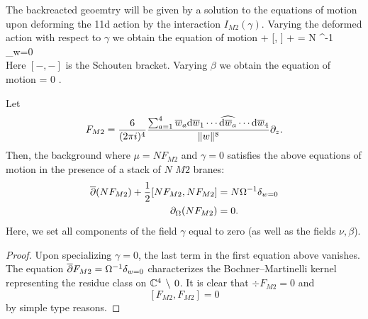 


The backreacted geoemtry will be given by a solution to the equations of motion upon deforming the 11d action by the interaction $I_{M2}(\gamma)$. 
Varying the deformed action with respect to $\gamma$ 
we obtain the equation of motion
\beqn\label{eqn:ads4eom1}
\dbar \mu +  [\mu, \mu] + \partial\gamma\partial\gamma = N \Omega^{-1} \delta_{w=0} \\
\eeqn
Here $[-,-]$ is the Schouten bracket. 
Varying $\beta$ we obtain the equation of motion
\beqn\label{eqn:adseom2}
\div \mu = 0 .
\eeqn

\begin{lem}
Let
\[
 F_{M2} = \frac{6}{(2\pi i)^4} \frac{\sum_{a=1}^4 \overline{w}_a {\rm d} \overline{w}_1 \cdots \widehat{{\rm d} \overline{w}_a} \cdots {\rm d} \overline{w}_4}{\|w\|^{8}} \partial_z .
\]
Then, the background where $\mu = N F_{M2}$ and $\gamma = 0$
satisfies the above equations of motion in the presence of a stack of $N$ $M2$ branes:
\begin{align*}
\overline{\partial} (N F_{M2}) + \frac12 [N F_{M2}, N F_{M2}] & = N \Omega^{-1} \delta_{w=0} \\
\partial_{\Omega} (N F_{M2}) & = 0  .
\end{align*}
Here, we set all components of the field $\gamma$ equal to zero (as well as the fields $\nu,\beta$). 
\end{lem}

\begin{proof}
Upon specializing $\gamma = 0$, the last term in the first equation above vanishes. The equation $\overline{\partial} F_{M2} = \Omega^{-1} \delta_{w=0}$ characterizes the Bochner--Martinelli kernel representing the residue class on $\mathbb C^4 \, \setminus \, 0$. 
It is clear that $\div F_{M2} = 0$ and 
\[
[F_{M2}, F_{M2}] = 0
\] 
by simple type reasons. 
\end{proof}

